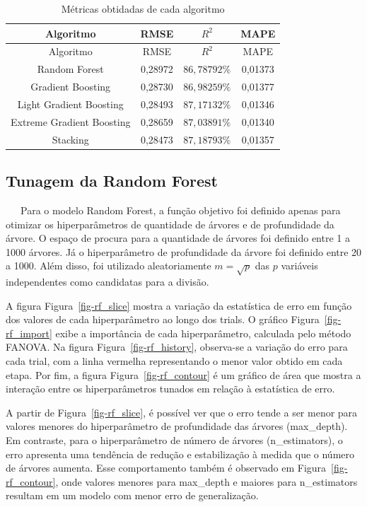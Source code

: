 \documentclass[
  12pt,
  a4paper,
]{scrreprt}
\begin{document}
\begin{longtable}[]{@{}cccc@{}}
\caption{Métricas obtidadas de cada
algoritmo}\label{tbl-metrics_models}\tabularnewline
\toprule\noalign{}
Algoritmo & RMSE & \(R^2\) & MAPE \\
\midrule\noalign{}
\endfirsthead
\toprule\noalign{}
Algoritmo & RMSE & \(R^2\) & MAPE \\
\midrule\noalign{}
\endhead
\bottomrule\noalign{}
\endlastfoot
Random Forest & 0,28972 & \(86,78792\%\) & 0,01373 \\
Gradient Boosting & 0,28730 & \(86,98259\%\) & 0,01377 \\
Light Gradient Boosting & 0,28493 & \(87,17132\%\) & 0,01346 \\
Extreme Gradient Boosting & 0,28659 & \(87,03891\%\) & 0,01340 \\
Stacking & 0,28473 & \(87,18793\%\) & 0,01357 \\
\end{longtable}

\subsection{Tunagem da Random Forest}\label{tunagem-da-random-forest}

~~~Para o modelo Random Forest, a função objetivo foi definido apenas
para otimizar os hiperparâmetros de quantidade de árvores e de
profundidade da árvore. O espaço de procura para a quantidade de árvores
foi definido entre 1 a 1000 árvores. Já o hiperparâmetro de profundidade
da árvore foi definido entre 20 a 1000. Além disso, foi utilizado
aleatoriamente \(m = \sqrt{p}\) das \(p\) variáveis independentes como
candidatas para a divisão.

\vspace{12pt}

A figura Figura~\ref{fig-rf_slice} mostra a variação da estatística de
erro em função dos valores de cada hiperparâmetro ao longo dos trials. O
gráfico Figura~\ref{fig-rf_import} exibe a importância de cada
hiperparâmetro, calculada pelo método FANOVA. Na figura
Figura~\ref{fig-rf_history}, observa-se a variação do erro para cada
trial, com a linha vermelha representando o menor valor obtido em cada
etapa. Por fim, a figura Figura~\ref{fig-rf_contour} é um gráfico de
área que mostra a interação entre os hiperparâmetros tunados em relação
à estatística de erro.

\vspace{12pt}

A partir de Figura~\ref{fig-rf_slice}, é possível ver que o erro tende a
ser menor para valores menores do hiperparâmetro de profundidade das
árvores (max\_depth). Em contraste, para o hiperparâmetro de número de
árvores (n\_estimators), o erro apresenta uma tendência de redução e
estabilização à medida que o número de árvores aumenta. Esse
comportamento também é observado em Figura~\ref{fig-rf_contour}, onde
valores menores para max\_depth e maiores para n\_estimators resultam em
um modelo com menor erro de generalização.
\end{document}
